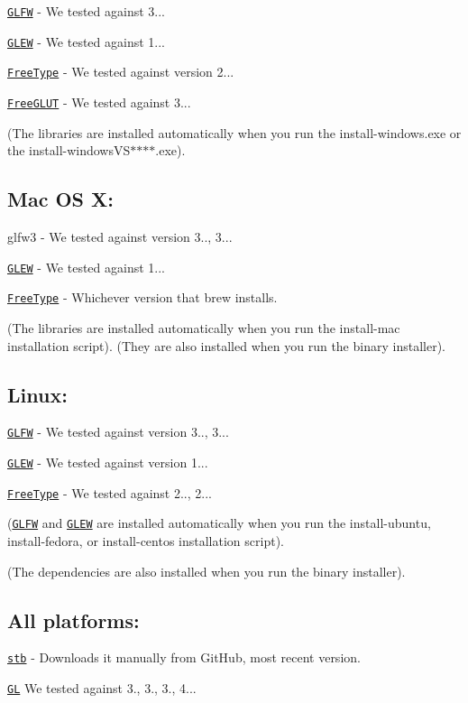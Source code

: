 \href{https://github.com/glfw/glfw/releases/download/3.1.1/glfw-3.1.1.zip}{\tt G\-L\-F\-W} -\/ We tested against 3...

\href{http://downloads.sourceforge.net/project/glew/glew/1.12.0/glew-1.12.0.zip}{\tt G\-L\-E\-W} -\/ We tested against 1...

\href{http://downloads.sourceforge.net/project/gnuwin32/freetype/2.3.5-1/freetype-2.3.5-1-bin.zip}{\tt Free\-Type} -\/ We tested against version 2...

\href{http://downloads.sourceforge.net/project/freeglut/freeglut/3.0.0/freeglut-3.0.0.tar.gz}{\tt Free\-G\-L\-U\-T} -\/ We tested against 3...

(The libraries are installed automatically when you run the install-\/windows.\-exe or the install-\/windows\-V\-S$\ast$$\ast$$\ast$$\ast$.exe).

\subsection*{Mac O\-S X\-:}

glfw3 -\/ We tested against version 3.., 3...

\href{http://downloads.sourceforge.net/project/glew/glew/1.12.0/glew-1.12.0.zip}{\tt G\-L\-E\-W} -\/ We tested against 1...

\href{http://downloads.sourceforge.net/project/gnuwin32/freetype/2.3.5-1/freetype-2.3.5-1-bin.zip}{\tt Free\-Type} -\/ Whichever version that brew installs.

(The libraries are installed automatically when you run the install-\/mac installation script). (They are also installed when you run the binary installer).

\subsection*{Linux\-:}

\href{http://www.glfw.org/download.html}{\tt G\-L\-F\-W} -\/ We tested against version 3.., 3...

\href{http://glew.sourceforge.net/}{\tt G\-L\-E\-W} -\/ We tested against version 1...

\href{http://www.freetype.org/download.html}{\tt Free\-Type} -\/ We tested against 2.., 2...

(\href{http://www.glfw.org/download.html}{\tt G\-L\-F\-W} and \href{http://downloads.sourceforge.net/project/glew/glew/1.12.0/glew-1.12.0.zip}{\tt G\-L\-E\-W} are installed automatically when you run the install-\/ubuntu, install-\/fedora, or install-\/centos installation script).

(The dependencies are also installed when you run the binary installer).

\subsection*{All platforms\-:}

\href{https://github.com/nothings/stb/archive/master.zip}{\tt stb} -\/ Downloads it manually from Git\-Hub, most recent version.

\href{https://www.opengl.org/}{\tt G\-L} We tested against 3., 3., 3., 4... 